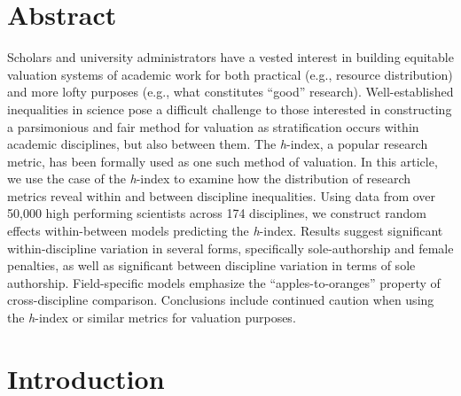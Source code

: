 \documentclass[
  10pt,
  letterpaper,
]{article}
\begin{document}
\newpage


\begin{flushleft}
{\Large
\textbf{}
}
\newline
\end{flushleft}

\section*{Abstract}
Scholars and university administrators have a vested interest in
building equitable valuation systems of academic work for both practical
(e.g., resource distribution) and more lofty purposes (e.g., what
constitutes ``good'' research). Well-established inequalities in science
pose a difficult challenge to those interested in constructing a
parsimonious and fair method for valuation as stratification occurs
within academic disciplines, but also between them. The \emph{h}-index,
a popular research metric, has been formally used as one such method of
valuation. In this article, we use the case of the \emph{h}-index to
examine how the distribution of research metrics reveal within and
between discipline inequalities. Using data from over 50,000 high
performing scientists across 174 disciplines, we construct random
effects within-between models predicting the \emph{h}-index. Results
suggest significant within-discipline variation in several forms,
specifically sole-authorship and female penalties, as well as
significant between discipline variation in terms of sole authorship.
Field-specific models emphasize the ``apples-to-oranges'' property of
cross-discipline comparison. Conclusions include continued caution when
using the \emph{h}-index or similar metrics for valuation purposes.


\linenumbers\hypertarget{introduction}{%
\section{Introduction}\label{introduction}}
\end{document}
